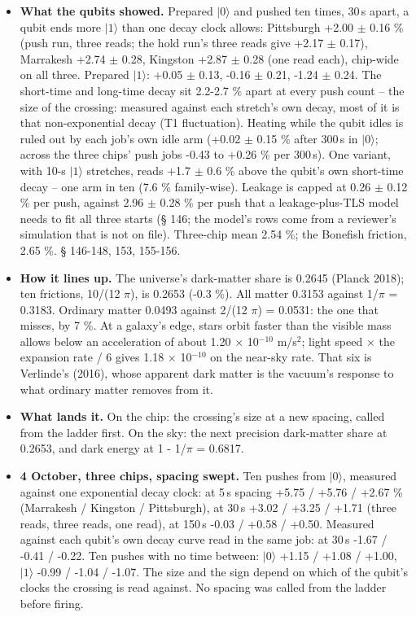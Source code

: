 \documentclass[11pt]{article}
\begin{document}
\begin{itemize}
\item \textbf{What the qubits showed.} Prepared \(|0\rangle\) and pushed ten times, 30\,\textmu s apart, a qubit ends more \(|1\rangle\) than one decay clock allows: Pittsburgh +2.00 \(\pm\) 0.16 \% (push run, three reads; the hold run's three reads give +2.17 \(\pm\) 0.17), Marrakesh +2.74 \(\pm\) 0.28, Kingston +2.87 \(\pm\) 0.28 (one read each), chip-wide on all three. Prepared \(|1\rangle\): +0.05 \(\pm\) 0.13, -0.16 \(\pm\) 0.21, -1.24 \(\pm\) 0.24. The short-time and long-time decay sit 2.2-2.7 \% apart at every push count -- the size of the crossing: measured against each stretch's own decay, most of it is that non-exponential decay (T1 fluctuation). Heating while the qubit idles is ruled out by each job's own idle arm (+0.02 \(\pm\) 0.15 \% after 300\,\textmu s in \(|0\rangle\); across the three chips' push jobs -0.43 to +0.26 \% per 300\,\textmu s). One variant, with 10-\textmu s \(|1\rangle\) stretches, reads +1.7 \(\pm\) 0.6 \% above the qubit's own short-time decay -- one arm in ten (7.6 \% family-wise). Leakage is capped at 0.26 \(\pm\) 0.12 \% per push, against 2.96 \(\pm\) 0.28 \% per push that a leakage-plus-TLS model needs to fit all three starts (\S{} 146; the model's rows come from a reviewer's simulation that is not on file). Three-chip mean 2.54 \%; the Bonefish friction, 2.65 \%. \S{} 146-148, 153, 155-156.
\item \textbf{How it lines up.} The universe's dark-matter share is 0.2645 (Planck 2018); ten frictions, 10/(12 \(\pi\)), is 0.2653 (-0.3 \%). All matter 0.3153 against 1/\(\pi\) = 0.3183. Ordinary matter 0.0493 against 2/(12 \(\pi\)) = 0.0531: the one that misses, by 7 \%. At a galaxy's edge, stars orbit faster than the visible mass allows below an acceleration of about 1.20 \(\times\) 10\(^{-10}\) m/s\(^{2}\); light speed \(\times\) the expansion rate / 6 gives 1.18 \(\times\) 10\(^{-10}\) on the near-sky rate. That six is Verlinde's (2016), whose apparent dark matter is the vacuum's response to what ordinary matter removes from it.
\item \textbf{What lands it.} On the chip: the crossing's size at a new spacing, called from the ladder first. On the sky: the next precision dark-matter share at 0.2653, and dark energy at 1 - 1/\(\pi\) = 0.6817.
\item \textbf{4 October, three chips, spacing swept.} Ten pushes from \(|0\rangle\), measured against one exponential decay clock: at 5\,\textmu s spacing +5.75 / +5.76 / +2.67 \% (Marrakesh / Kingston / Pittsburgh), at 30\,\textmu s +3.02 / +3.25 / +1.71 (three reads, three reads, one read), at 150\,\textmu s -0.03 / +0.58 / +0.50. Measured against each qubit's own decay curve read in the same job: at 30\,\textmu s -1.67 / -0.41 / -0.22. Ten pushes with no time between: \(|0\rangle\) +1.15 / +1.08 / +1.00, \(|1\rangle\) -0.99 / -1.04 / -1.07. The size and the sign depend on which of the qubit's clocks the crossing is read against. No spacing was called from the ladder before firing.
\end{itemize}
\end{document}
